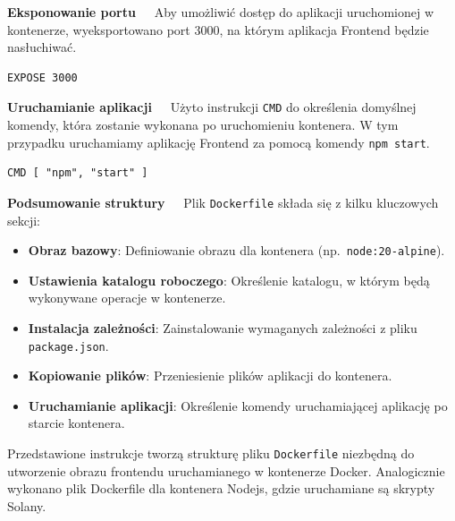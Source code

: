 \noindent \textbf{Eksponowanie portu~~}
Aby umożliwić dostęp do aplikacji uruchomionej w kontenerze, wyeksportowano port 3000, na którym aplikacja Frontend będzie nasłuchiwać.
\begin{lstlisting}[basicstyle=\footnotesize\ttfamily]
EXPOSE 3000
\end{lstlisting}

\noindent \textbf{Uruchamianie aplikacji~~}
Użyto instrukcji \texttt{CMD} do określenia domyślnej komendy, która zostanie wykonana po uruchomieniu kontenera. W tym przypadku uruchamiamy aplikację Frontend za pomocą komendy \texttt{npm start}.
\begin{lstlisting}[basicstyle=\footnotesize\ttfamily]
CMD [ "npm", "start" ]
\end{lstlisting}

\noindent \textbf{Podsumowanie struktury~~}
Plik \texttt{Dockerfile} składa się z kilku kluczowych sekcji:
\begin{itemize}
    \item \textbf{Obraz bazowy}: Definiowanie obrazu dla kontenera (np.\ \texttt{node:20-alpine}).
    \item \textbf{Ustawienia katalogu roboczego}: Określenie katalogu, w którym będą wykonywane operacje w kontenerze.
    \item \textbf{Instalacja zależności}: Zainstalowanie wymaganych zależności z pliku \texttt{package.json}.
    \item \textbf{Kopiowanie plików}: Przeniesienie plików aplikacji do kontenera.
    \item \textbf{Uruchamianie aplikacji}: Określenie komendy uruchamiającej aplikację po starcie kontenera.
\end{itemize}

\noindent Przedstawione instrukcje tworzą strukturę pliku \texttt{Dockerfile} niezbędną do utworzenie obrazu frontendu uruchamianego w kontenerze Docker. Analogicznie wykonano plik Dockerfile dla kontenera Nodejs, gdzie uruchamiane są skrypty Solany.

